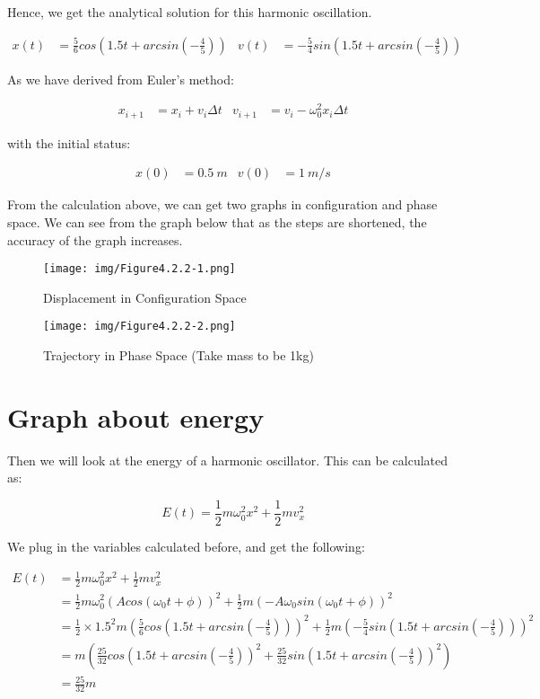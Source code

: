 \documentclass[12pt]{article}
\begin{document}
Hence, we get the analytical solution for this harmonic oscillation. 

\begin{align}
    x(t) &= \frac{5}{6} cos( 1.5 t + arcsin(-\frac{4}{5}) ) & 
    v(t) &= -\frac{5}{4} sin( 1.5 t + arcsin(-\frac{4}{5}) )
\end{align}

As we have derived from Euler's method: 

\begin{align}
    x_{i+1} &= x_{i} + v_{i} \Delta t &
    v_{i+1} &= v_{i} - \omega_{0}^2 x_{i} \Delta t \nonumber 
\end{align}

with the initial status: 

\begin{align}
    x(0) &= 0.5 \ m & 
    v(0) &= 1 \ m/s \nonumber 
\end{align}

From the calculation above, we can get two graphs in configuration and phase space. We can see from the graph below that as the steps are shortened, the accuracy of the graph increases. 

\begin{figure}[htb]
    \centering
    \texttt{[image: img/Figure4.2.2-1.png]}
    \caption{Displacement in Configuration Space}
\end{figure} 

\begin{figure}[htb]
    \centering
    \texttt{[image: img/Figure4.2.2-2.png]}
    \caption{Trajectory in Phase Space (Take mass to be 1kg)}
\end{figure} 

\section{Graph about energy}
Then we will look at the energy of a harmonic oscillator. This can be calculated as: 

\begin{equation}
    E(t) = \frac{1}{2} m \omega_{0}^2 x^2 + \frac{1}{2} m v_{x}^2 
\end{equation}

We plug in the variables calculated before, and get the following: 

\begin{align}
    E(t) &= \frac{1}{2} m \omega_{0}^2 x^2 + \frac{1}{2} m v_{x}^2 \\
         &= \frac{1}{2} m \omega_{0}^2 (A cos( \omega_{0} t + \phi ))^2 + \frac{1}{2} m (-A \omega_{0} sin( \omega_{0} t + \phi ))^2 \nonumber \\
         &= \frac{1}{2} \times 1.5^2 m (\frac{5}{6} cos( 1.5 t + arcsin(-\frac{4}{5}) ))^2 + \frac{1}{2} m (-\frac{5}{4} sin( 1.5 t + arcsin(-\frac{4}{5}) ))^2 \nonumber \\
         &= m\left(\frac{25}{32}cos( 1.5 t + arcsin(-\frac{4}{5}))^2 + \frac{25}{32}sin( 1.5 t + arcsin(-\frac{4}{5}))^2\right) \nonumber \\
         &= \frac{25}{32}m \nonumber
\end{align}
\end{document}
